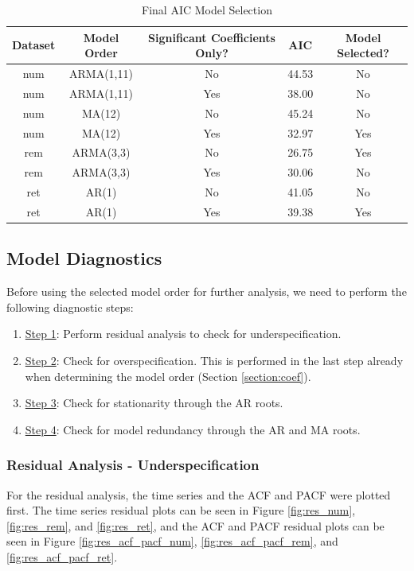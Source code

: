 \documentclass[a4paper]{article}
\begin{document}
\begin{table}[h!]
    \centering
    \caption{Final AIC Model Selection}
    \begin{tabular}{|c|c|c|c|c|}
    \hline
    Dataset & Model Order & Significant Coefficients Only? & AIC & Model Selected? \\
    \hline
    num & ARMA(1,11) & No & 44.53 & No \\
    \hline
    num & ARMA(1,11) & Yes & 38.00 & No \\
    \hline
    num & MA(12) & No & 45.24 & No \\
    \hline
    num & MA(12) & Yes & 32.97 & Yes \\
    \hline
    rem & ARMA(3,3) & No &  26.75 & Yes \\
    \hline
    rem & ARMA(3,3) & Yes & 30.06 & No \\
    \hline
    ret & AR(1) & No &  41.05 & No \\
    \hline
    ret & AR(1) & Yes &  39.38 & Yes \\
    \hline
    \end{tabular}
    \label{tab:aic2}
\end{table}

\subsection{Model Diagnostics}

Before using the selected model order for further analysis, we need to perform the following diagnostic steps:
\begin{enumerate}
  \item \underline{Step 1}: Perform residual analysis to check for underspecification.
  \item \underline{Step 2}: Check for overspecification. This is performed in the last step already when determining the model order (Section \ref{section:coef}).
  \item \underline{Step 3}: Check for stationarity through the AR roots.
  \item \underline{Step 4}: Check for model redundancy through the AR and MA roots.
\end{enumerate}

\subsubsection{Residual Analysis - Underspecification}
For the residual analysis, the time series and the ACF and PACF were plotted first. The time series residual plots can be seen in Figure \ref{fig:res_num}, \ref{fig:res_rem}, and \ref{fig:res_ret}, and the ACF and PACF residual plots can be seen in Figure \ref{fig:res_acf_pacf_num}, \ref{fig:res_acf_pacf_rem}, and \ref{fig:res_acf_pacf_ret}.
\end{document}
